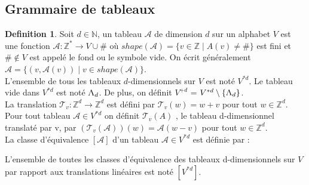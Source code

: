 \documentclass[12pt]{article}
\theoremstyle{definition}
\newtheorem{definition}{Definition}
\begin{document}
	\subsection{Grammaire de tableaux }
	\begin{definition}
		Soit $d \in \mathbb{N} $, un tableau $\mathcal{A}$ de dimension $d$ sur un alphabet $V$ est une fonction $\mathcal{A} : \mathbb{Z}^{*} \rightarrow V \cup  {\#} $ où $shape(\mathcal{A}) = \{v \in \mathbb{Z} \mid A(v) \ne \# \} $  est fini et ${\#} \notin V $ est appelé le fond ou le symbole vide. On écrit généralement  $ \mathcal{A} = \{(v, \mathcal{A}(v)) \mid v  \in shape(\mathcal{A})\}$. \\
		
		L'ensemble de tous les tableaux $d$-dimensionnels sur $V$ est noté $V^{*d} $. Le tableau vide dans $V^{*d} $ est noté $\rotatebox[origin=c]{180}{V}_{d}$. De plus, on définit $V^{+d}$ = $V^{*d} \setminus \{ \rotatebox[origin=c]{180}{V}_{d}\} $.\\
		
		La translation $\mathcal{T}_{v} : \mathbb{Z}^{d} \rightarrow \mathbb{Z}^{d} $ est défini par $\mathcal{T}_{v}(w) = w + v$ pour tout $w \in \mathbb{Z}^{d} $.\\
		
		Pour tout tableau $\mathcal{A} \in  V^{*d} $ on définit $\mathcal{T}_{v}(A)$ , le tableau d-dimensionnel translaté par v, par $(\mathcal{T}_{v}(\mathcal{A}))(w) = \mathcal{A}(w-v)$ pour tout $w \in \mathbb{Z}^{d}$. \\
		
		La classe d'équivalence $[\mathcal{A}]$ d'un tableau $\mathcal{A} \in  V^{*d} $ est définie par : \\
		
		{\par{} \par} 
		
		\medskip
		
		L'ensemble de toutes les classes d'équivalence des tableaux d-dimensionnels sur $V$ par rapport aux translations linéaires est noté $[V^{*d}]$. \\
	\end{definition}
	
\end{document}
